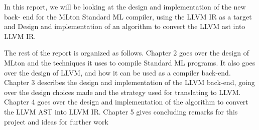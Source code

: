 \documentclass{book}
\begin{document}
In this report, we will be looking at the design and implementation of the new back-
end for the MLton Standard ML compiler, using the LLVM IR as a target and Design and implementation of an algorithm to convert the LLVM ast into LLVM IR.

The rest of the report is organized as follows. Chapter 2 goes over the design of MLton
and the techniques it uses to compile Standard ML programs.  It also goes over the design
of LLVM, and how it can be used as a compiler back-end.  Chapter 3 describes the design
and implementation of the LLVM back-end, going over the design choices made and the
strategy used for translating to LLVM. Chapter 4 goes over the design and implementation of the algorithm to convert the LLVM AST into LLVM IR. Chapter 5 gives concluding remarks for this project and ideas for further work
\end{document}
